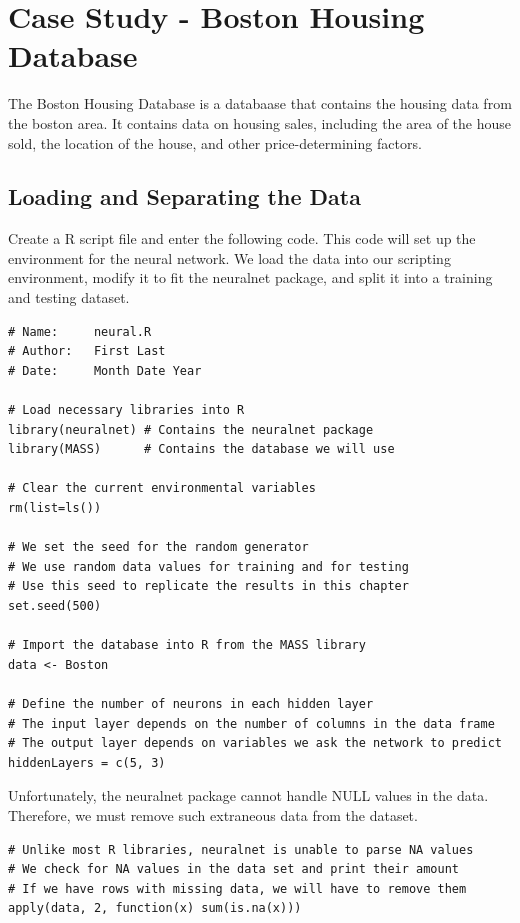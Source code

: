 \documentclass[11pt]{article}
\begin{document}
\section{Case Study - Boston Housing Database}

The Boston Housing Database is a databaase that contains the housing data from the boston area. It contains data on housing sales, including the area of the house sold, the location of the house, and other price-determining factors.\\

\subsection{Loading and Separating the Data}
Create a R script file and enter the following code. This code will set up the environment for the neural network. We load the data into our scripting environment, modify it to fit the neuralnet package, and split it into a training and testing dataset. 
\begin{lstlisting}
# Name:     neural.R
# Author:   First Last
# Date:     Month Date Year

# Load necessary libraries into R
library(neuralnet) # Contains the neuralnet package
library(MASS)      # Contains the database we will use

# Clear the current environmental variables
rm(list=ls())

# We set the seed for the random generator
# We use random data values for training and for testing
# Use this seed to replicate the results in this chapter
set.seed(500)

# Import the database into R from the MASS library
data <- Boston

# Define the number of neurons in each hidden layer
# The input layer depends on the number of columns in the data frame
# The output layer depends on variables we ask the network to predict
hiddenLayers = c(5, 3)
\end{lstlisting}

Unfortunately, the neuralnet package cannot handle NULL values in the data. Therefore, we must remove such extraneous data from the dataset.

\begin{lstlisting}
# Unlike most R libraries, neuralnet is unable to parse NA values
# We check for NA values in the data set and print their amount
# If we have rows with missing data, we will have to remove them
apply(data, 2, function(x) sum(is.na(x)))
\end{lstlisting}
\end{document}
